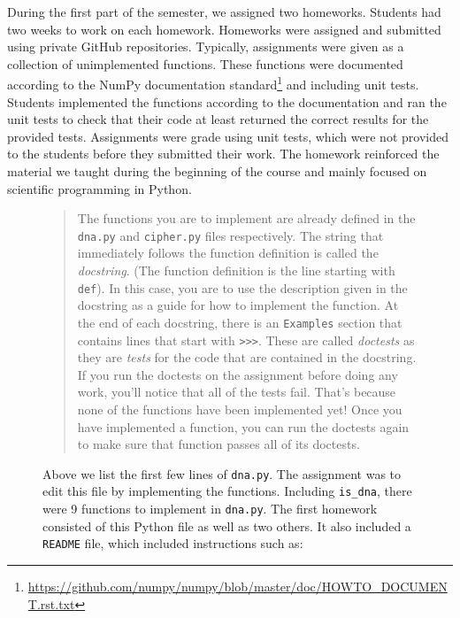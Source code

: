 During the first part of the semester, we assigned two homeworks.
Students had two weeks to work on each homework.
Homeworks were assigned and submitted using private GitHub repositories.
Typically, assignments were given as a collection of unimplemented
functions.
These functions were documented according to the NumPy documentation
standard\footnote{\url{https://github.com/numpy/numpy/blob/master/doc/HOWTO_DOCUMENT.rst.txt}}
and including unit tests.
Students implemented the functions according to the documentation
and ran the unit tests to check that their code at least
returned the correct results for the provided tests.
Assignments were grade using unit tests, which were not provided to
the students before they submitted their work.
The homework reinforced the material we taught during the
beginning of the course and mainly focused on scientific programming
in Python.


\begin{figure}
\centering

\caption{Above we list the first few lines of \texttt{dna.py}.
The assignment was to edit this file by implementing the functions.
Including \texttt{is\_dna}, there were 9 functions
to implement in \texttt{dna.py}.
The first homework consisted of this Python file as well as two others.
It also included a \texttt{README} file, which included instructions
such as:}\label{fig:dna}
\begin{quotation}
The functions you are to implement are already defined in the \texttt{dna.py} and
\texttt{cipher.py} files respectively. The string that immediately follows the function
definition is called the \emph{docstring}. (The function definition is the line
starting with \texttt{def}). In this case, you are to use the description given in the
docstring as a guide for how to implement the function. At the end of each
docstring, there is an \texttt{Examples} section that contains lines that start with
\verb|>>>|. These are called \emph{doctests} as they are \emph{tests} for the code that are
contained in the docstring. If you run the doctests on the assignment before
doing any work, you'll notice that all of the tests fail. That's because none
of the functions have been implemented yet! Once you have implemented a
function, you can run the doctests again to make sure that function passes all
of its doctests.
\end{quotation}
\end{figure}

